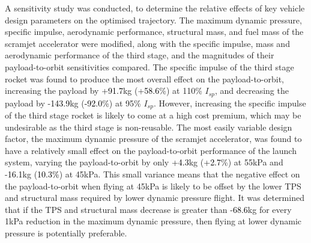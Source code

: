 A sensitivity study was conducted, to determine the relative effects of key vehicle design parameters on the optimised trajectory. 
The maximum dynamic pressure, specific impulse, aerodynamic performance, structural mass, and fuel mass of the scramjet accelerator were modified, along with the specific impulse, mass and aerodynamic performance of the third stage, and the magnitudes of their payload-to-orbit sensitivities compared. 
The specific impulse of the third stage rocket was found to produce the most overall effect on the payload-to-orbit, increasing the payload by +\textcolor{black}{91.7}kg (+\textcolor{black}{58.6}\%) at 110\% $I_{sp}$, and decreasing the payload by -\textcolor{black}{143.9}kg (\textcolor{black}{-92.0}\%) at 95\% $I_{sp}$. However, increasing the specific impulse of the third stage rocket is likely to come at a high cost premium, which may be undesirable as the third stage is non-reusable. 
The most easily variable design factor, the maximum dynamic pressure of the scramjet accelerator, was found to have a relatively small effect on the payload-to-orbit performance of the launch system, varying the payload-to-orbit by only +\textcolor{black}{4.3}kg (+\textcolor{black}{2.7}\%) at 55kPa and -\textcolor{black}{16.1}kg (\textcolor{black}{10.3\%}) at 45kPa. This small variance means that the negative effect on the payload-to-orbit when flying at 45kPa is likely to be offset by the lower TPS and structural mass required by lower dynamic pressure flight. It was determined that if the TPS and structural mass decrease is greater than -\textcolor{black}{68.6}kg for every 1kPa reduction in the maximum dynamic pressure, then flying at lower dynamic pressure is potentially preferable. 







